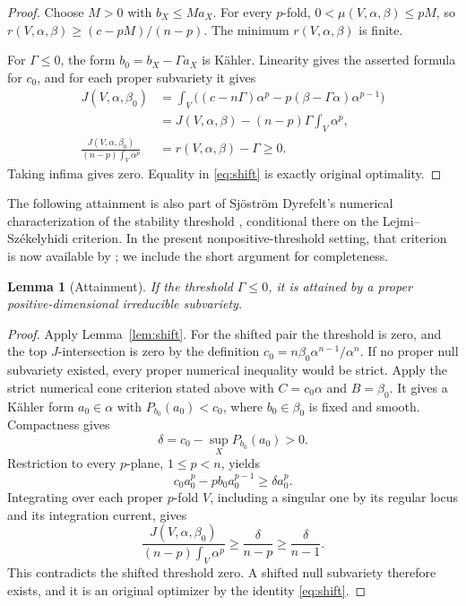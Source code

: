 \documentclass[reqno]{amsart}
\theoremstyle{remark}
\theoremstyle{plain}
\newtheorem{lemma}[thm]{Lemma}
\begin{document}
\begin{proof}
Choose \(M>0\) with \(b_X\le M a_X\). For every \(p\)-fold, \(0<\mu(V,\alpha,\beta)\le pM\), so \(r(V,\alpha,\beta)\ge(c-pM)/(n-p)\). The minimum $r(V,\alpha,\beta)$ is finite. 

For \(\Gamma\le0\), the form \(b_0=b_X-\Gamma a_X\) is K\"ahler. Linearity gives the asserted formula for \(c_0\), and for each proper subvariety it gives
\begin{equation}\label{eq:shift}
\begin{aligned}
J(V,\alpha,\beta_0)
&=\int_V\bigl((c-n\Gamma)\alpha^p-p(\beta-\Gamma\alpha)\alpha^{p-1}\bigr)\\
&=J(V,\alpha,\beta)-(n-p)\Gamma\int_V\alpha^p,\\
\frac{J(V,\alpha,\beta_0)}{(n-p)\int_V\alpha^p}&=r(V,\alpha,\beta)-\Gamma\ge0.
\end{aligned}
\end{equation}
Taking infima gives zero. Equality in \eqref{eq:shift} is exactly original optimality. 
\end{proof}


The following attainment is also part of Sj\"ostr\"om Dyrefelt's numerical characterization of the stability threshold \cite[Theorems 5 and 24]{SD20}, conditional there on the Lejmi--Sz\'ekelyhidi criterion. In the present nonpositive-threshold setting, that criterion is now available by \cite{S20}; we include the short argument for completeness.

\begin{lemma}[Attainment]\label{lem:attainment}
If the threshold \(\Gamma\leq 0\), it is attained by a proper positive-dimensional irreducible subvariety.
\end{lemma}

\begin{proof}
Apply Lemma~\ref{lem:shift}. For the shifted pair the threshold is zero, and the top \(J\)-intersection is zero by the definition \(c_0=n\beta_0\alpha^{n-1}/\alpha^n\). If no proper null subvariety existed, every proper numerical inequality would be strict. Apply the strict numerical cone criterion stated above with \(C=c_0\alpha\) and \(B=\beta_0\). It gives a K\"ahler form \(a_0\in\alpha\) with \(P_{b_0}(a_0)<c_0\), where \(b_0\in\beta_0\) is fixed and smooth. Compactness gives
\[
\delta=c_0-\sup_XP_{b_0}(a_0)>0.
\]
Restriction to every \(p\)-plane, \(1\le p<n\), yields
\[
c_0a_0^p-pb_0a_0^{p-1}\ge\delta a_0^p.
\]
Integrating over each proper \(p\)-fold \(V\), including a singular one by its regular locus and its integration current, gives
\[
\frac{J(V,\alpha,\beta_0)}{(n-p)\int_V\alpha^p}
\ge\frac{\delta}{n-p}\ge\frac{\delta}{n-1}.
\]
This contradicts the shifted threshold zero. A shifted null subvariety therefore exists, and it is an original optimizer by the identity \eqref{eq:shift}.
\end{proof}
\end{document}
